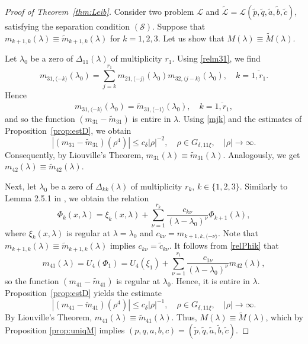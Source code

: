 \documentclass[a4paper,12pt]{article}
\newcommand{\de}{\delta}
\newcommand{\la}{\lambda}
\theoremstyle{plain}
\numberwithin{equation}{section}
\theoremstyle{definition}
\theoremstyle{remark}
\begin{document}
\begin{proof}[Proof of Theorem~\ref{thm:Leib}]
Consider two problem $\mathcal L$ and $\tilde{\mathcal L} = \mathcal L(\tilde p, \tilde q, \tilde a, \tilde b, \tilde c)$, satisfying the separation condition $(\mathcal S)$.
Suppose that $m_{k+1,k}(\la) \equiv \tilde m_{k+1,k}(\la)$ for $k = 1, 2, 3$. Let us show that $M(\la) \equiv \tilde M(\la)$. 

Let $\la_0$ be a zero of $\Delta_{11}(\la)$ of multiplicity $r_1$. Using \eqref{relm31}, we find
$$
m_{31,\langle -k \rangle}(\la_0) = \sum_{j = k}^{r_1} m_{21,\langle-j\rangle}(\la_0) m_{32,\langle j-k \rangle}(\la_0), \quad k = \overline{1,r_1}.
$$
Hence
$$
m_{31,\langle -k \rangle}(\la_0) = \tilde m_{31,\langle -1 \rangle}(\la_0), \quad k = \overline{1,r_1},
$$
and so the function $(m_{31} - \tilde m_{31})$ is entire in $\la$. Using \eqref{mjk} and the estimates of Proposition~\ref{prop:estD}, we obtain
$$
|(m_{31} - \tilde m_{31})(\rho^4)| \le c_{\de} |\rho|^{-2}, \quad \rho \in G_{\de,11\xi}, \quad |\rho| \to \infty.
$$
Consequently, by Liouville's Theorem, $m_{31}(\la) \equiv \tilde m_{31}(\la)$. Analogously, we get $m_{42}(\la) \equiv \tilde m_{42}(\la)$.

Next, let $\la_0$ be a zero of $\Delta_{kk}(\la)$ of multiplicity $r_k$, $k \in \{ 1, 2, 3 \}$. Similarly to Lemma 2.5.1 in \cite{Yur02}, we obtain the relation
\begin{equation} \label{relPhik}
\Phi_k(x, \la) = \xi_k(x, \la) + \sum_{\nu = 1}^{r_k} \frac{c_{k\nu}}{(\la - \la_0)^{\nu}} \Phi_{k+1}(\la),
\end{equation}
where $\xi_k(x, \la)$ is regular at $\la = \la_0$ and $c_{k\nu} = m_{k+1,k,\langle -\nu \rangle}$. Note that $m_{k+1,k}(\la) \equiv \tilde m_{k+1,k}(\la)$ implies $c_{k\nu} = \tilde c_{k\nu}$. It follows from \eqref{relPhik} that
$$
m_{41}(\la) = U_4(\Phi_1) = U_4(\xi_1) + \sum_{\nu = 1}^{r_1} \frac{c_{1\nu}}{(\la - \la_0)^{\nu}} m_{42}(\la),
$$
so the function $(m_{41} - \tilde m_{41})$ is regular at $\la_0$. Hence, it is entire in $\la$. Proposition~\ref{prop:estD} yields the estimate 
$$
|(m_{41} - \tilde m_{41})(\rho^4)| \le c_{\de} |\rho|^{-1}, \quad \rho \in G_{\de,11\xi}, \quad |\rho| \to \infty.
$$
By Liouville's Theorem, $m_{41}(\la) \equiv \tilde m_{41}(\la)$. 
Thus, $M(\la) \equiv \tilde M(\la)$, which by Proposition \ref{prop:uniqM} implies $(p,q,a,b,c) = (\tilde p, \tilde q, \tilde a, \tilde b, \tilde c)$.
\end{proof}
\end{document}
